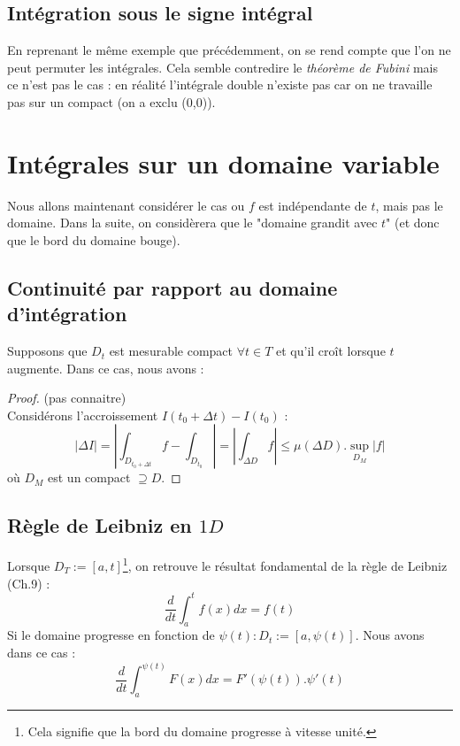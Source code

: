 \documentclass[11pt, a4paper, openany]{book}
\begin{document}
									
		\subsection{Intégration sous le signe intégral}
		En reprenant le même exemple que précédemment, on se rend compte que l'on ne peut permuter les intégrales. Cela semble contredire le \textit{théorème de Fubini} mais ce n'est pas le cas : en réalité l'intégrale double n'existe pas car on ne travaille pas sur un compact (on a exclu (0,0)). 
									
		\section{Intégrales sur un domaine variable}
		Nous allons maintenant considérer le cas ou $f$ est indépendante de $t$, mais pas le domaine. Dans la suite, on considèrera que le "domaine grandit avec $t$" (et donc que le bord du domaine bouge).
									
		\subsection{Continuité par rapport au domaine d'intégration}
		Supposons que $D_t$ est mesurable compact $\forall t \in T$ et qu'il croît lorsque $t$ augmente. Dans ce cas, nous avons :\\
		\begin{proof}(pas connaitre)\\
			Considérons l'accroissement $I(t_0 + \Delta t) - I(t_0)$ :
			$$|\Delta I| = \left|\int_{D_{t_0 + \Delta t}} f - \int_{D_{t_0}}\right| = \left|\int_{\Delta D} f \right| \leq \mu(\Delta D).\sup\limits_{D_M}|f|$$
			où $D_M$ est un compact $\supseteq D$.
		\end{proof}
									
		\subsection{Règle de Leibniz en $1D$}
		Lorsque $D_T := [a,t]$\footnote{Cela signifie que la bord du domaine progresse à vitesse unité.}, on retrouve le résultat fondamental de la règle de Leibniz (Ch.9) :
		\begin{equation}
			\frac{d}{dt}\int_a^t f(x)dx = f(t)
		\end{equation}
		Si le domaine progresse en fonction de $\psi(t) : D_t := [a, \psi(t)]$. Nous avons dans ce cas : 
		\begin{equation}
			\frac{d}{dt}\int_a^{\psi(t)} F(x) dx = F'(\psi(t)).\psi'(t)
		\end{equation}
									
\end{document}
